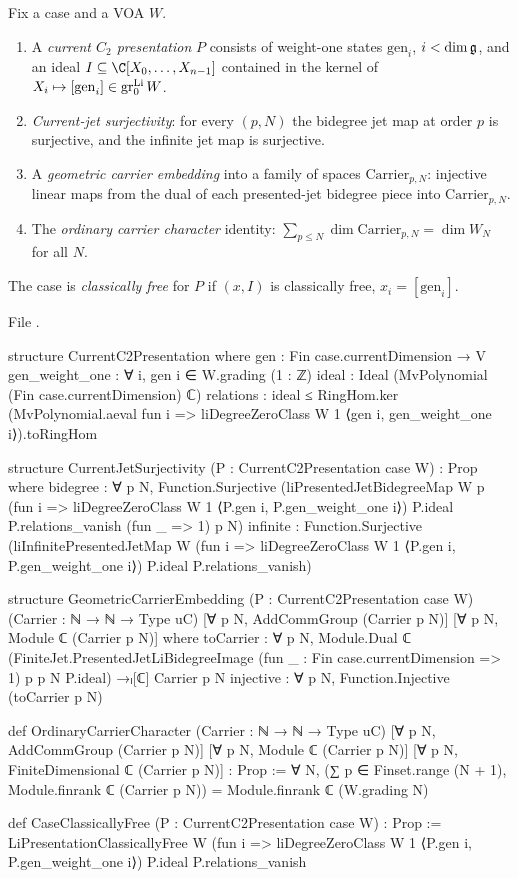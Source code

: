 \begin{definition}\label{l24:def:packages}
Fix a case and a VOA $W$.
\begin{enumerate}
\item A \emph{current $C_2$ presentation} $P$ consists of weight-one states $\mathrm{gen}_i$,
  $i<\dim\mathfrak g$, and an ideal $I\subseteq\C[X_0,\dots,X_{n-1}]$ contained in the kernel of
  $X_i\mapsto[\mathrm{gen}_i]\in\operatorname{gr}^{\mathrm{Li}}_0W$.
\item \emph{Current-jet surjectivity}: for every $(p,N)$ the bidegree jet map at order $p$ is surjective,
  and the infinite jet map is surjective.
\item A \emph{geometric carrier embedding} into a family of spaces $\mathrm{Carrier}_{p,N}$: injective linear
  maps from the dual of each presented-jet bidegree piece into $\mathrm{Carrier}_{p,N}$.
\item The \emph{ordinary carrier character} identity: $\sum_{p\le N}\dim\mathrm{Carrier}_{p,N}=\dim W_N$ for all $N$.
\end{enumerate}
The case is \emph{classically free} for $P$ if $(x,I)$ is classically free, $x_i=[\mathrm{gen}_i]$.
\end{definition}
\noindent File .
\begin{leancode}
structure CurrentC2Presentation where
  gen : Fin case.currentDimension → V
  gen_weight_one : ∀ i, gen i ∈ W.grading (1 : ℤ)
  ideal : Ideal (MvPolynomial (Fin case.currentDimension) ℂ)
  relations : ideal ≤ RingHom.ker
      (MvPolynomial.aeval fun i =>
        liDegreeZeroClass W 1 ⟨gen i, gen_weight_one i⟩).toRingHom

structure CurrentJetSurjectivity (P : CurrentC2Presentation case W) : Prop where
  bidegree : ∀ p N, Function.Surjective
    (liPresentedJetBidegreeMap W p
      (fun i => liDegreeZeroClass W 1 ⟨P.gen i, P.gen_weight_one i⟩)
      P.ideal P.relations_vanish (fun _ => 1) p N)
  infinite : Function.Surjective
    (liInfinitePresentedJetMap W
      (fun i => liDegreeZeroClass W 1 ⟨P.gen i, P.gen_weight_one i⟩)
      P.ideal P.relations_vanish)

structure GeometricCarrierEmbedding
    (P : CurrentC2Presentation case W)
    (Carrier : ℕ → ℕ → Type uC)
    [∀ p N, AddCommGroup (Carrier p N)]
    [∀ p N, Module ℂ (Carrier p N)] where
  toCarrier : ∀ p N,
    Module.Dual ℂ
      (FiniteJet.PresentedJetLiBidegreeImage
        (fun _ : Fin case.currentDimension => 1) p p N P.ideal) →ₗ[ℂ]
      Carrier p N
  injective : ∀ p N, Function.Injective (toCarrier p N)

def OrdinaryCarrierCharacter
    (Carrier : ℕ → ℕ → Type uC)
    [∀ p N, AddCommGroup (Carrier p N)]
    [∀ p N, Module ℂ (Carrier p N)]
    [∀ p N, FiniteDimensional ℂ (Carrier p N)] : Prop :=
  ∀ N,
    (∑ p ∈ Finset.range (N + 1), Module.finrank ℂ (Carrier p N)) =
      Module.finrank ℂ (W.grading N)

def CaseClassicallyFree (P : CurrentC2Presentation case W) : Prop :=
  LiPresentationClassicallyFree W
    (fun i => liDegreeZeroClass W 1 ⟨P.gen i, P.gen_weight_one i⟩)
    P.ideal P.relations_vanish
\end{leancode}

